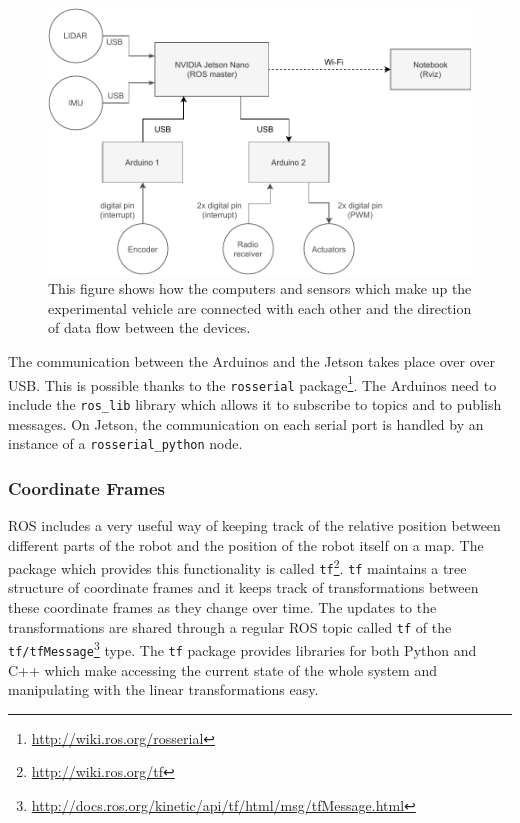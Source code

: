 \begin{figure}
	\centering
	\includegraphics[width=125mm]{../img/ros_diagram}
	\caption{This figure shows how the computers and sensors which make up the experimental vehicle are connected with each other and the direction of data flow between the devices.}
	\label{fig:ros_diagram}
\end{figure}

The communication between the Arduinos and the Jetson takes place over over USB. This is possible thanks to the \verb|rosserial| package\footnote{\url{http://wiki.ros.org/rosserial}}. The Arduinos need to include the \verb|ros_lib| library which allows it to subscribe to topics and to publish messages. On Jetson, the communication on each serial port is handled by an instance of a \verb|rosserial_python| node.

\subsubsection{Coordinate Frames}

\Gls{ROS} includes a very useful way of keeping track of the relative position between different parts of the robot and the position of the robot itself on a map. The package which provides this functionality is called \verb|tf|\footnote{\url{http://wiki.ros.org/tf}}. \verb|tf| maintains a tree structure of coordinate frames and it keeps track of transformations between these coordinate frames as they change over time. The updates to the transformations are shared through a regular \gls*{ROS} topic called \verb|tf| of the \texttt{tf/tfMessage}\footnote{\url{http://docs.ros.org/kinetic/api/tf/html/msg/tfMessage.html}} type. The \verb|tf| package provides libraries for both Python and C++ which make accessing the current state of the whole system and manipulating with the linear transformations easy.

